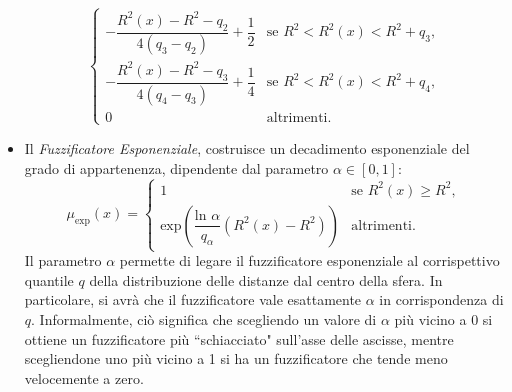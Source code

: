 \documentclass [11pt,a4paper,twoside,openright] {book}
\begin{document}
\begin{itemize}
\begin{equation}
\begin{cases}
-\dfrac{R^2(x)-R^2-q_2}{4(q_3-q_2)} +\dfrac{1}{2} & \text{se } R^2 < R^2(x) < R^2 + q_3, \\
-\dfrac{R^2(x)-R^2-q_3}{4(q_4-q_3)} +\dfrac{1}{4} & \text{se } R^2 < R^2(x) < R^2 + q_4, \\
0 & \text{altrimenti}.
\end{cases}
\end{equation}
\item Il \textit{Fuzzificatore Esponenziale}, costruisce un decadimento esponenziale del grado di appartenenza, dipendente dal parametro $\alpha \in [0,1]$:
\begin{equation}
\mu_{\mathrm{exp}}(x)=
\begin{cases}
1 & \text{se } R^2(x) \geq R^2, \\
\mathrm{exp}(\dfrac{\text{ln }\alpha}{q_{\alpha}}(R^2(x)-R^2)) & \text{altrimenti}.
\end{cases}
\end{equation}
Il parametro $\alpha$ permette di legare il fuzzificatore esponenziale al corrispettivo quantile $q$ della distribuzione delle distanze dal centro della sfera. In particolare, si avrà che il fuzzificatore vale esattamente $\alpha$ in corrispondenza di $q$. Informalmente, ciò significa che scegliendo un valore di $\alpha$ più vicino a 0 si ottiene un fuzzificatore più ``schiacciato" sull'asse delle ascisse, mentre scegliendone uno più vicino a 1 si ha un fuzzificatore che tende meno velocemente a zero.
\end{itemize}
\end{document}
